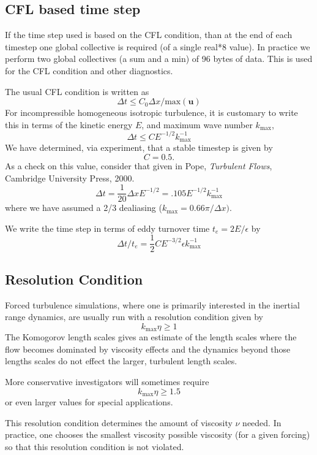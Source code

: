 \documentclass[12pt]{article}
\newcommand{\uv}{\mathbf u}
\begin{document}
\subsection{CFL based time step}

If the time step used is based on the CFL condition, than at
the end of each timestep one global collective is required 
(of a single real*8 value).  In practice we perform two global collectives
(a sum and a min) of 96 bytes of data.  This is used for the CFL condition
and other diagnostics.  

The usual CFL condition is written as 
\[
\Delta t \le C_0  { \Delta x } / { \text{max} ( \uv ) }
\]
For incompressible homogeneous isotropic turbulence, it is customary
to write this in terms of the kinetic energy $E$, and maximum
wave number $k_\text{max}$,
\[
\Delta t \le C    E^{-1/2} k_\text{max}^{-1}
\]
We have determined, via experiment, that a stable timestep is
given by 
\[
C=0.5.
\]  
As a check on this value, consider that given
in Pope, {\em Turbulent Flows}, Cambridge University Press, 2000.
\[
 \Delta t = \frac1{20} \Delta x E^{-1/2} = .105   E^{-1/2} k_\text{max}^{-1}
\]
where we have assumed a 2/3 dealiasing ($k_\text{max}=0.66\pi/\Delta x)$.  

We write the time step in terms of eddy turnover time $t_e = 2 E / \epsilon $
by
\[
\Delta t / t_e =  \frac12 C E^{-3/2} \epsilon  k_\text{max}^{-1}
\]



\subsection{Resolution Condition}

Forced turbulence simulations, where one is primarily interested in
the inertial range dynamics, are usually run with a resolution condition
given by
\[
   k_\text{max} \eta \ge 1
\]
The Komogorov length scales gives an estimate of the length scales
where the flow becomes dominated by viscosity effects and the dynamics
beyond those lengths scales do not effect the larger, turbulent length
scales.

More conservative investigators will sometimes require
\[
   k_\text{max} \eta \ge 1.5
\]
or even larger values for special applications.  

This resolution condition determines the amount of viscosity $\nu$
needed.  In practice, one chooses the smallest viscosity possible
viscosity (for a given forcing) so that this resolution condition is
not violated.  
\end{document}
